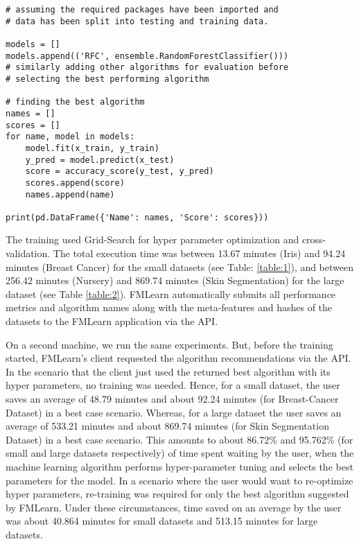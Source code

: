 \begin{lstlisting}
# assuming the required packages have been imported and 
# data has been split into testing and training data.

models = []
models.append(('RFC', ensemble.RandomForestClassifier()))
# similarly adding other algorithms for evaluation before 
# selecting the best performing algorithm

# finding the best algorithm
names = []
scores = []
for name, model in models:
    model.fit(x_train, y_train)
    y_pred = model.predict(x_test)
    score = accuracy_score(y_test, y_pred)
    scores.append(score)
    names.append(name)

print(pd.DataFrame({'Name': names, 'Score': scores}))
\end{lstlisting}

The training used Grid-Search for hyper parameter optimization and cross-validation. The total execution time was between 13.67 minutes (Iris) and 94.24 minutes (Breast Cancer) for the small datasets (see Table: \ref{table:1}), and between 256.42 minutes (Nursery) and 869.74 minutes (Skin Segmentation) for the large dataset (see Table \ref{table:2}). FMLearn automatically submits all performance metrics and algorithm names along with the meta-features and hashes of the datasets to the FMLearn application via the API. 
 
 On a second machine, we run the same experiments. But, before the training started, FMLearn's client requested the algorithm recommendations via the API. In the scenario that the client just used the returned best algorithm with its hyper parameters, no training was needed. Hence, for a small dataset, the user saves an average of 48.79 minutes and about 92.24 minutes (for Breast-Cancer Dataset) in a best case scenario. Whereas, for a large dataset the user saves an average of 533.21 minutes and about 869.74 minutes (for Skin Segmentation Dataset) in a best case scenario. This amounts to about 86.72\% and 95.762\% (for small and large datasets respectively) of time spent waiting by the user, when the machine learning algorithm performs hyper-parameter tuning and selects the best parameters for the model. In a scenario where the user would want to re-optimize hyper parameters, re-training was required for only the best algorithm suggested by FMLearn. Under these circumstances, time saved on an average by the user was about 40.864 minutes for small datasets and 513.15 minutes for large datasets.
\newline
 
